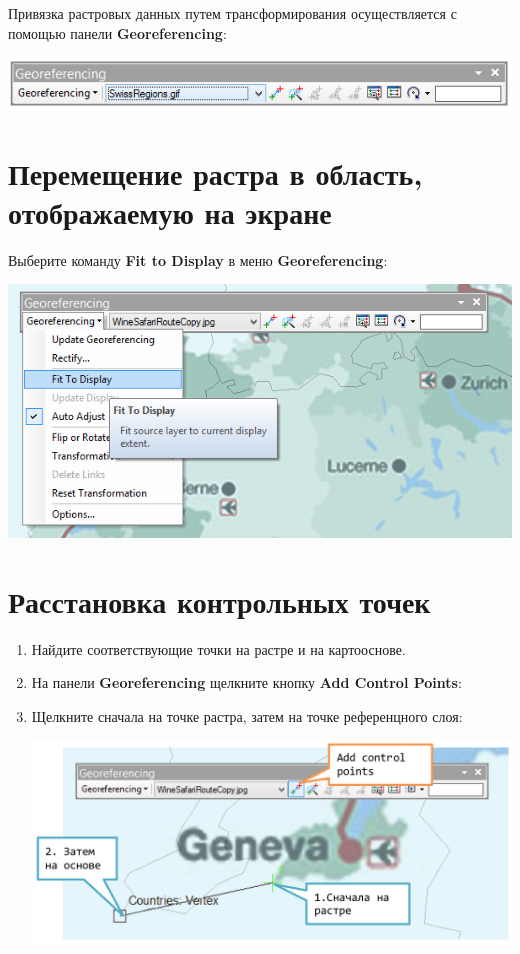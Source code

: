 \documentclass[]{book}
\theoremstyle{definition}
\theoremstyle{definition}
\theoremstyle{definition}
\theoremstyle{remark}
\begin{document}
Привязка растровых данных путем трансформирования осуществляется с
помощью панели \textbf{Georeferencing}:

\includegraphics{images/Appendix/image81.png}

\hypertarget{------}{%
\section{Перемещение растра в область, отображаемую на
экране}\label{------}}

Выберите команду \textbf{Fit to Display} в меню \textbf{Georeferencing}:

\includegraphics{images/Appendix/image82.png}

\hypertarget{--}{%
\section{Расстановка контрольных точек}\label{--}}

\begin{enumerate}
\def\labelenumi{\arabic{enumi}.}
\item
  Найдите соответствующие точки на растре и на картооснове.
\item
  На панели \textbf{Georeferencing} щелкните кнопку \textbf{Add Control
  Points}:
\item
  Щелкните сначала на точке растра, затем на точке референцного слоя:

  \includegraphics{images/Appendix/image83.png}
\end{enumerate}
\end{document}
